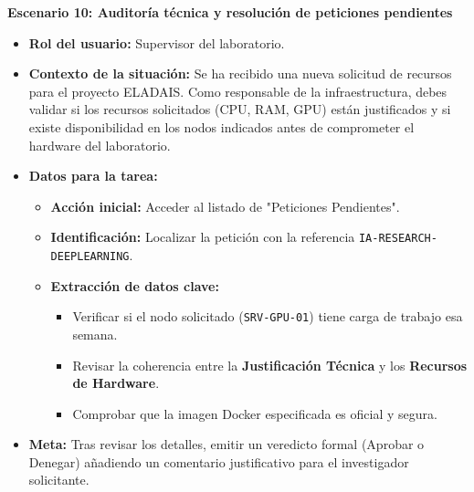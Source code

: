\noindent\textbf{Escenario 10: Auditoría técnica y resolución de peticiones pendientes}
\begin{itemize}
    \item \textbf{Rol del usuario:} Supervisor del laboratorio.
    \item \textbf{Contexto de la situación:} 
    Se ha recibido una nueva solicitud de recursos para el proyecto ELADAIS. Como responsable de la infraestructura, debes validar si los recursos solicitados (CPU, RAM, GPU) están justificados y si existe disponibilidad en los nodos indicados antes de comprometer el hardware del laboratorio.
    
    \item \textbf{Datos para la tarea:}
        \begin{itemize}
            \item \textbf{Acción inicial:} Acceder al listado de "Peticiones Pendientes".
            \item \textbf{Identificación:} Localizar la petición con la referencia \texttt{IA-RESEARCH-DEEPLEARNING}.
            \item \textbf{Extracción de datos clave:}
                \begin{itemize}
                    \item Verificar si el nodo solicitado (\texttt{SRV-GPU-01}) tiene carga de trabajo esa semana.
                    \item Revisar la coherencia entre la \textbf{Justificación Técnica} y los \textbf{Recursos de Hardware}.
                    \item Comprobar que la imagen Docker especificada es oficial y segura.
                \end{itemize}
        \end{itemize}
    \item \textbf{Meta:} 
    Tras revisar los detalles, emitir un veredicto formal (Aprobar o Denegar) añadiendo un comentario justificativo para el investigador solicitante.
\end{itemize}
